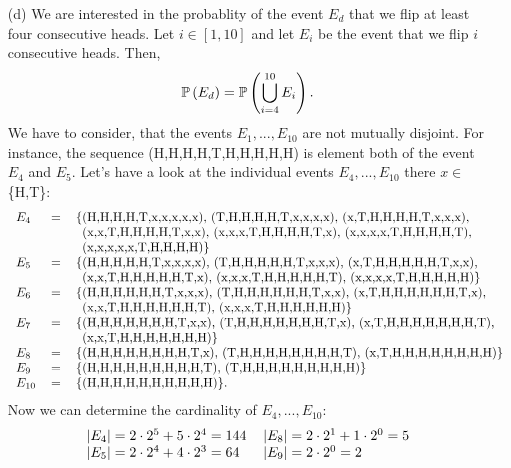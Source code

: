 \begin{enumerate}
  \item[(d)] We are interested in the probablity of the event $E_d$ that we flip
    at least four consecutive heads. Let $i \in [1,10]$ and let $E_i$ be the event
    that we flip $i$ consecutive heads. Then,
    \[ \mathbb{P}\left(E_d\right) = \mathbb{P}\left(\bigcup_{i=4}^{10} E_i\right).\]
    We have to consider, that the events $E_1,..., E_{10}$ are not mutually disjoint.
    For instance, the sequence (H,H,H,H,T,H,H,H,H,H) is element both of the event
    $E_4$ and $E_5$. Let's have a look at the individual events $E_4,..., E_{10}$
    there $x \in$ \{H,T\}:
    \begin{align*}
      \begin{tabular}{lll}
        $E_4$ &=  &\{(H,H,H,H,T,x,x,x,x,x), (T,H,H,H,H,T,x,x,x,x), (x,T,H,H,H,H,T,x,x,x), \\
              &   &\ \,(x,x,T,H,H,H,H,T,x,x), (x,x,x,T,H,H,H,H,T,x), (x,x,x,x,T,H,H,H,H,T), \\
              &   &\ \,(x,x,x,x,x,T,H,H,H,H)\} \\
        $E_5$ &= &\{(H,H,H,H,H,T,x,x,x,x), (T,H,H,H,H,H,T,x,x,x), (x,T,H,H,H,H,H,T,x,x), \\
              &   &\ \,(x,x,T,H,H,H,H,H,T,x), (x,x,x,T,H,H,H,H,H,T), (x,x,x,x,T,H,H,H,H,H)\} \\
        $E_6$ &=  &\{(H,H,H,H,H,H,T,x,x,x), (T,H,H,H,H,H,H,T,x,x), (x,T,H,H,H,H,H,H,T,x), \\
              &   &\ \,(x,x,T,H,H,H,H,H,H,T), (x,x,x,T,H,H,H,H,H,H)\} \\
        $E_7$ &=  &\{(H,H,H,H,H,H,H,T,x,x), (T,H,H,H,H,H,H,H,T,x), (x,T,H,H,H,H,H,H,H,T), \\
              &   &\ \,(x,x,T,H,H,H,H,H,H,H)\} \\
        $E_8$ &=  &\{(H,H,H,H,H,H,H,H,T,x), (T,H,H,H,H,H,H,H,H,T), (x,T,H,H,H,H,H,H,H,H)\} \\
        $E_9$ &=  &\{(H,H,H,H,H,H,H,H,H,T), (T,H,H,H,H,H,H,H,H,H)\} \\
        $E_{10}$ &=  &\{(H,H,H,H,H,H,H,H,H,H)\}.
      \end{tabular}
    \end{align*}
    Now we can determine the cardinality of $E_4, ..., E_{10}$:
    \begin{align*}
      \begin{tabular}{ll}
        $|E_4| = 2 \cdot 2^5 + 5 \cdot 2^4 = 144$   &$|E_8| = 2 \cdot 2^1 + 1 \cdot 2^0 = 5$ \\
        $|E_5| = 2 \cdot 2^4 + 4 \cdot 2^3 = 64$    &$|E_9| = 2 \cdot 2^0 = 2$ \\

\end{tabular}
\end{align*}
\end{enumerate}
